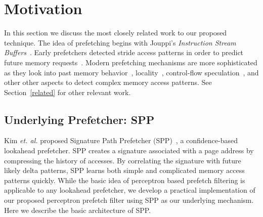 \section{Motivation}
\label{Background}

In this section we discuss the most closely related work to our
proposed technique.  The idea of prefetching begins with Jouppi's
\textit{Instruction Stream Buffers}~\cite{ISB}. Early prefetchers
detected stride access patterns in order to predict future memory
requests~\cite{Smith,Baer,Stride}. Modern prefetching mechanisms are
more sophisticated as they look into past memory
behavior~\cite{Address_Correlated,AMPM},
locality~\cite{Spatial_Pattern,SMS,Temporal_Instruction_Fetch,Off_Chip,STMS,SMS_JILP},
control-flow speculation~\cite{BFetch,MTBFetch}, and other other
aspects to detect complex memory access patterns.  See
Section~\ref{related} for other relevant work.


\subsection{{\color{red}Underlying Prefetcher: SPP}}
\label{Background-SPP}

Kim {\em et. al.} proposed Signature Path Prefetcher (SPP)~\cite{SPP},
a confidence-based lookahead prefetcher.  SPP creates a signature
associated with a page address by compressing the history of
accesses. By correlating the signature with future likely delta
patterns, SPP learns both simple and complicated memory access
patterns quickly.  While the basic idea of perceptron based prefetch
filtering is applicable to any lookahead prefetcher, we develop a
practical implementation of our proposed perceptron prefetch filter
using SPP as our {\color{red}underlying mechanism}. 
Here we describe the basic architecture of SPP.

